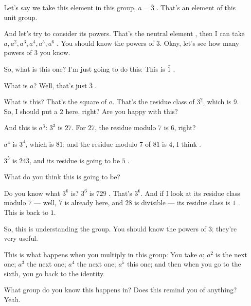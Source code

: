 \begin{hidden}
\end{hidden}

\begin{speech}[00:37:28 - 00:38:51]
Let's say we take this element in this group, $a = \bar{3}$ . That's an element of this unit group.

And let's try to consider its powers. That's the neutral element , then I can take $a, a^2, a^3, a^4, a^5, a^6$ . You should know the powers of $3$. Okay, let's see how many powers of $3$ you know.

So, what is this one? I'm just going to do this: This is $\bar{1}$ .

What is $a$? Well, that's just $\bar{3}$ .

What is this? That's the square of $a$. That's the residue class of $3^2$, which is $9$. So, I should put a $2$ here, right?  Are you happy with this?

And this is $a^3$: $3^3$ is $27$. For $27$, the residue modulo $7$ is $6$, right? 

$a^4$ is $3^4$, which is $81$; and the residue modulo $7$ of $81$ is $4$, I think .

$3^5$ is $243$, and its residue is going to be $5$ .
\end{speech}

\begin{speech}[00:38:51 - 00:39:45]
What do you think this is going to be? 

Do you know what $3^6$ is? $3^6$ is $729$ . That's $3^6$. And if I look at its residue class modulo $7$ --- well, $7$ is already here, and $28$ is divisible --- its residue class is $1$ . This is back to $1$.

So, this is understanding the group. You should know the powers of $3$; they're very useful.

This is what happens when you multiply in this group: You take $a$; $a^2$ is the next one; $a^3$ the next one; $a^4$ the next one; $a^5$ this one; and then when you go to the sixth, you go back to the identity.

What group do you know this happens in? Does this remind you of anything? Yeah.
\end{speech}

